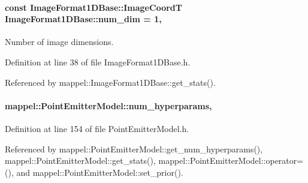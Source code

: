 \paragraph[{\texorpdfstring{num\+\_\+dim}{num_dim}}]{\setlength{\rightskip}{0pt plus 5cm}const {\bf Image\+Format1\+D\+Base\+::\+Image\+CoordT} Image\+Format1\+D\+Base\+::num\+\_\+dim = 1\hspace{0.3cm}{\ttfamily [static]}, {\ttfamily [inherited]}}\hypertarget{classmappel_1_1ImageFormat1DBase_af81159de9010c3618d2f69349c1f2368}{}\label{classmappel_1_1ImageFormat1DBase_af81159de9010c3618d2f69349c1f2368}
Number of image dimensions. 

Definition at line 38 of file Image\+Format1\+D\+Base.\+h.



Referenced by mappel\+::\+Image\+Format1\+D\+Base\+::get\+\_\+stats().

\paragraph[{\texorpdfstring{num\+\_\+hyperparams}{num_hyperparams}}]{ mappel\+::\+Point\+Emitter\+Model\+::num\+\_\+hyperparams\hspace{0.3cm}{\ttfamily [protected]}, {\ttfamily [inherited]}}\hypertarget{classmappel_1_1PointEmitterModel_ab2423214fdd81c8212118770b5b17b1f}{}\label{classmappel_1_1PointEmitterModel_ab2423214fdd81c8212118770b5b17b1f}


Definition at line 154 of file Point\+Emitter\+Model.\+h.



Referenced by mappel\+::\+Point\+Emitter\+Model\+::get\+\_\+num\+\_\+hyperparams(), mappel\+::\+Point\+Emitter\+Model\+::get\+\_\+stats(), mappel\+::\+Point\+Emitter\+Model\+::operator=(), and mappel\+::\+Point\+Emitter\+Model\+::set\+\_\+prior().


